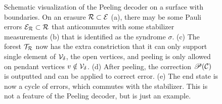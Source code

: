\begin{figure}
    \caption{Schematic visualization of the Peeling decoder on a surface with boundaries. On an erasure $\mathcal{R}\subset \mathcal{E}$ (a), there may be some Pauli errors $\mathcal{E}_{\mathcal{R}} \subset \mathcal{R}$ that anticommutes with some stabilizer measurements (b) that is identified as the syndrome $\sigma$. (c) The forest $\mathcal{T}_{\mathcal{R}}$ now has the extra constriction that it can only support single element of $\mathcal{V}_\delta$, the open vertices, and peeling is only allowed on pendant vertices $v\notin \mathcal{V}_\delta$. (d) After peeling, the correction $\mathscr{P}(\mathcal{C})$ is outputted and can be applied to correct error. (e) The end state is now a cycle of errors, which commutes with the stabilizer. This is not a feature of the Peeling decoder, but is just an example.}
  \end{figure}